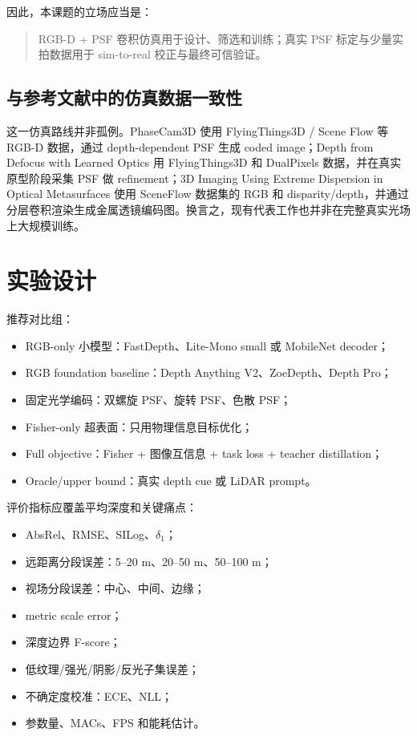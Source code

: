 \documentclass[11pt,a4paper,fontset=none]{ctexart}
\begin{document}
因此，本课题的立场应当是：
\begin{quote}
RGB-D + PSF 卷积仿真用于设计、筛选和训练；真实 PSF 标定与少量实拍数据用于 sim-to-real 校正与最终可信验证。
\end{quote}

\subsection{与参考文献中的仿真数据一致性}

这一仿真路线并非孤例。PhaseCam3D 使用 FlyingThings3D / Scene Flow 等 RGB-D 数据，通过 depth-dependent PSF 生成 coded image；Depth from Defocus with Learned Optics 用 FlyingThings3D 和 DualPixels 数据，并在真实原型阶段采集 PSF 做 refinement；3D Imaging Using Extreme Dispersion in Optical Metasurfaces 使用 SceneFlow 数据集的 RGB 和 disparity/depth，并通过分层卷积渲染生成金属透镜编码图。换言之，现有代表工作也并非在完整真实光场上大规模训练。

\section{实验设计}

推荐对比组：
\begin{itemize}
  \item RGB-only 小模型：FastDepth、Lite-Mono small 或 MobileNet decoder；
  \item RGB foundation baseline：Depth Anything V2、ZoeDepth、Depth Pro；
  \item 固定光学编码：双螺旋 PSF、旋转 PSF、色散 PSF；
  \item Fisher-only 超表面：只用物理信息目标优化；
  \item Full objective：Fisher + 图像互信息 + task loss + teacher distillation；
  \item Oracle/upper bound：真实 depth cue 或 LiDAR prompt。
\end{itemize}

评价指标应覆盖平均深度和关键痛点：
\begin{itemize}
  \item AbsRel、RMSE、SILog、$\delta_1$；
  \item 远距离分段误差：5--20 m、20--50 m、50--100 m；
  \item 视场分段误差：中心、中间、边缘；
  \item metric scale error；
  \item 深度边界 F-score；
  \item 低纹理/强光/阴影/反光子集误差；
  \item 不确定度校准：ECE、NLL；
  \item 参数量、MACs、FPS 和能耗估计。
\end{itemize}
\end{document}
